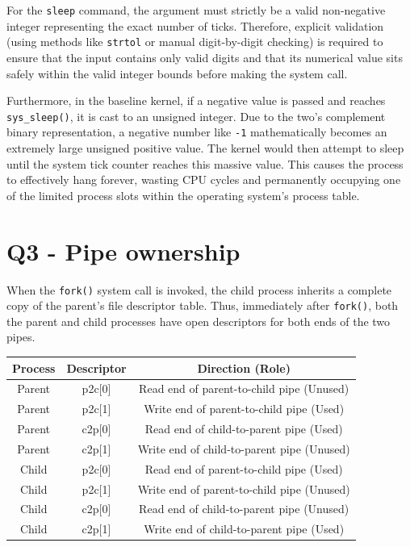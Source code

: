 \documentclass[11pt,a4paper]{article}
\begin{document}
For the \texttt{sleep} command, the argument must strictly be a valid non-negative integer representing the exact number of ticks. Therefore, explicit validation (using methods like \texttt{strtol} or manual digit-by-digit checking) is required to ensure that the input contains only valid digits and that its numerical value sits safely within the valid integer bounds before making the system call.

Furthermore, in the baseline kernel, if a negative value is passed and reaches \texttt{sys\_sleep()}, it is cast to an unsigned integer. Due to the two's complement binary representation, a negative number like \texttt{-1} mathematically becomes an extremely large unsigned positive value. The kernel would then attempt to sleep until the system tick counter reaches this massive value. This causes the process to effectively hang forever, wasting CPU cycles and permanently occupying one of the limited process slots within the operating system's process table.

\section*{Q3 - Pipe ownership}

When the \texttt{fork()} system call is invoked, the child process inherits a complete copy of the parent's file descriptor table. Thus, immediately after \texttt{fork()}, both the parent and child processes have open descriptors for both ends of the two pipes.

\begin{center}
\begin{tabular}{|c|c|c|}
\hline
\textbf{Process} & \textbf{Descriptor} & \textbf{Direction (Role)} \\
\hline
Parent & p2c[0] & Read end of parent-to-child pipe (Unused) \\
\hline
Parent & p2c[1] & Write end of parent-to-child pipe (Used) \\
\hline
Parent & c2p[0] & Read end of child-to-parent pipe (Used) \\
\hline
Parent & c2p[1] & Write end of child-to-parent pipe (Unused) \\
\hline
Child & p2c[0] & Read end of parent-to-child pipe (Used) \\
\hline
Child & p2c[1] & Write end of parent-to-child pipe (Unused) \\
\hline
Child & c2p[0] & Read end of child-to-parent pipe (Unused) \\
\hline
Child & c2p[1] & Write end of child-to-parent pipe (Used) \\
\hline
\end{tabular}
\end{center}
\end{document}
